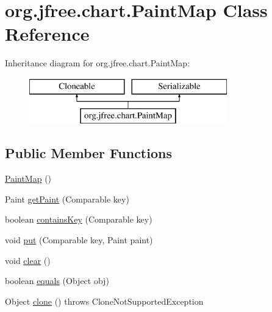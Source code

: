 \hypertarget{classorg_1_1jfree_1_1chart_1_1_paint_map}{}\section{org.\+jfree.\+chart.\+Paint\+Map Class Reference}
\label{classorg_1_1jfree_1_1chart_1_1_paint_map}
Inheritance diagram for org.\+jfree.\+chart.\+Paint\+Map\+:\begin{figure}[H]
\begin{center}
\leavevmode
\includegraphics[height=2.000000cm]{classorg_1_1jfree_1_1chart_1_1_paint_map}
\end{center}
\end{figure}
\subsection*{Public Member Functions}
\begin{DoxyCompactItemize}
\item 
\mbox{\hyperlink{classorg_1_1jfree_1_1chart_1_1_paint_map_a1685803b58df9efd74550f791c47c9ad}{Paint\+Map}} ()
\item 
Paint \mbox{\hyperlink{classorg_1_1jfree_1_1chart_1_1_paint_map_af22525235cd7efae3a417da12999dd8f}{get\+Paint}} (Comparable key)
\item 
boolean \mbox{\hyperlink{classorg_1_1jfree_1_1chart_1_1_paint_map_a515547bfe3ec967cddac165a01d60a7f}{contains\+Key}} (Comparable key)
\item 
void \mbox{\hyperlink{classorg_1_1jfree_1_1chart_1_1_paint_map_a0859d8456587840dd23ee6ff7de44dac}{put}} (Comparable key, Paint paint)
\item 
void \mbox{\hyperlink{classorg_1_1jfree_1_1chart_1_1_paint_map_a15a0aa8e6cbf5339fd3b1ac54d645410}{clear}} ()
\item 
boolean \mbox{\hyperlink{classorg_1_1jfree_1_1chart_1_1_paint_map_afa33e31ef63bb7e178521c3903e5230f}{equals}} (Object obj)
\item 
Object \mbox{\hyperlink{classorg_1_1jfree_1_1chart_1_1_paint_map_ab200a8d2cad8dfb435483cbfeb3929e3}{clone}} ()  throws Clone\+Not\+Supported\+Exception 
\end{DoxyCompactItemize}


